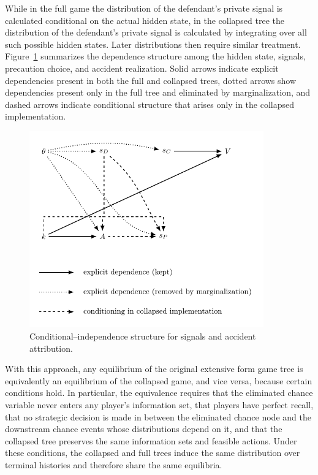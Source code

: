 \documentclass{article}
\begin{document}
While in the full game the distribution of the defendant's private signal is calculated conditional on the actual hidden state, in the collapsed tree the distribution of the defendant's private signal is calculated by integrating over all such possible hidden states. Later distributions then require similar treatment. Figure~\ref{fig:signals_graph} summarizes the dependence structure among the hidden state, signals, precaution choice, and accident realization. Solid arrows indicate explicit dependencies present in both the full and collapsed trees, dotted arrows show dependencies present only in the full tree and eliminated by marginalization, and dashed arrows indicate conditional structure that arises only in the collapsed implementation.

\begin{figure}[t]
  \centering
  \includegraphics[width=0.9\textwidth]{../Figures/signals_graph.pdf}
  \caption{Conditional–independence structure for signals and accident attribution.}
  \label{fig:signals_graph}
\end{figure}

With this approach, any equilibrium of the original extensive form game tree is equivalently an equilibrium of the collapsed game, and vice versa, because certain conditions hold. In particular, the equivalence requires that the eliminated chance variable never enters any player’s information set, that players have perfect recall, that no strategic decision is made in between the eliminated chance node and the downstream chance events whose distributions depend on it, and that the collapsed tree preserves the same information sets and feasible actions. Under these conditions, the collapsed and full trees induce the same distribution over terminal histories and therefore share the same equilibria.
\end{document}
